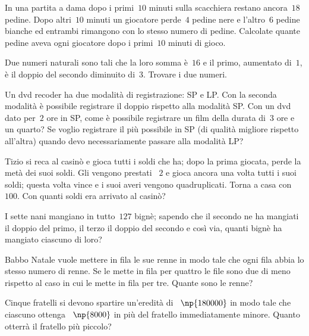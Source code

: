 \begin{multicols}{2}
\begin{esercizio}
In una partita a dama dopo i primi~$10$ minuti sulla scacchiera restano ancora~$18$ pedine. Dopo altri~$10$ minuti un giocatore perde~$4$ pedine nere e l'altro~$6$ pedine bianche ed entrambi rimangono con lo stesso numero di pedine. Calcolate quante pedine aveva ogni giocatore dopo i primi~$10$ minuti di gioco.
\end{esercizio}

\begin{esercizio}[\Ast]
Due numeri naturali sono tali che la loro somma è~$16$ e il primo, aumentato di~$1$, è il doppio del secondo diminuito di~$3$. Trovare i due numeri.
\end{esercizio}

\begin{esercizio}
Un dvd recoder ha due modalità di registrazione: SP e LP. Con la seconda modalità è possibile registrare il doppio rispetto alla modalità SP. Con un dvd dato per~$2$ ore in SP, come è possibile registrare un film della durata di~$3$ ore e un quarto? Se voglio registrare il più possibile in SP (di qualità migliore rispetto all'altra) quando devo necessariamente passare alla modalità LP?
\end{esercizio}

\begin{esercizio}[\Ast]
Tizio si reca al casinò e gioca tutti i soldi che ha; dopo la prima giocata, perde la metà dei suoi soldi. Gli vengono prestati \officialeuro~$2$ e gioca ancora una volta tutti i suoi soldi; questa volta vince e i suoi averi vengono quadruplicati. Torna a casa con \officialeuro~$100$. Con quanti soldi era arrivato al casinò?
\end{esercizio}

\begin{esercizio}[\Ast]
I sette nani mangiano in tutto~$127$ bignè; sapendo che il secondo ne ha mangiati il doppio del primo, il terzo il doppio del secondo e così via, quanti bignè ha mangiato ciascuno di loro?
\end{esercizio}

\begin{esercizio}[\Ast]
Babbo Natale vuole mettere in fila le sue renne in modo tale che ogni fila abbia lo stesso numero di renne. Se le mette in fila per quattro le file sono due di meno rispetto al caso in cui le mette in fila per tre. Quante sono le renne?
\end{esercizio}

\begin{esercizio}[\Ast]
Cinque fratelli si devono spartire un'eredità di \officialeuro~$\np{180000}$ in modo tale che ciascuno ottenga \officialeuro~$\np{8000}$ in più del fratello immediatamente minore. Quanto otterrà il fratello più piccolo?
\end{esercizio}


\end{multicols}
